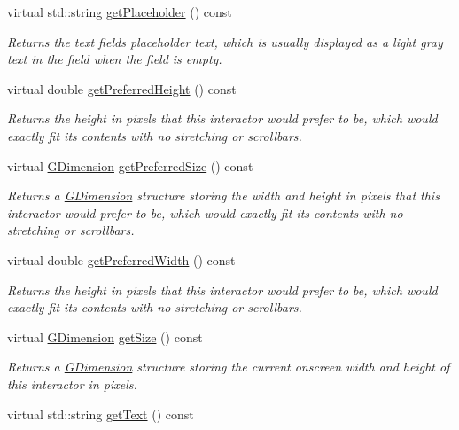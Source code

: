 \begin{DoxyCompactItemize}
virtual std\+::string \mbox{\hyperlink{classGTextField_aa78dbaa7dac1f8cdf9048c91abecc7ad}{get\+Placeholder}} () const
\begin{DoxyCompactList}\small\item\em Returns the text field\textquotesingle{}s placeholder text, which is usually displayed as a light gray text in the field when the field is empty. \end{DoxyCompactList}\item 
virtual double \mbox{\hyperlink{classGInteractor_a747de0961653847bdc6615dbf756d715}{get\+Preferred\+Height}} () const
\begin{DoxyCompactList}\small\item\em Returns the height in pixels that this interactor would prefer to be, which would exactly fit its contents with no stretching or scrollbars. \end{DoxyCompactList}\item 
virtual \mbox{\hyperlink{structGDimension}{G\+Dimension}} \mbox{\hyperlink{classGInteractor_a4aabbee761d8e9116275401131b7ccd1}{get\+Preferred\+Size}} () const
\begin{DoxyCompactList}\small\item\em Returns a \mbox{\hyperlink{structGDimension}{G\+Dimension}} structure storing the width and height in pixels that this interactor would prefer to be, which would exactly fit its contents with no stretching or scrollbars. \end{DoxyCompactList}\item 
virtual double \mbox{\hyperlink{classGInteractor_a82bca31d37700fb0e35d2743352efd5e}{get\+Preferred\+Width}} () const
\begin{DoxyCompactList}\small\item\em Returns the height in pixels that this interactor would prefer to be, which would exactly fit its contents with no stretching or scrollbars. \end{DoxyCompactList}\item 
virtual \mbox{\hyperlink{structGDimension}{G\+Dimension}} \mbox{\hyperlink{classGInteractor_a7b4eec96a2bdc6420695d5796a78eea9}{get\+Size}} () const
\begin{DoxyCompactList}\small\item\em Returns a \mbox{\hyperlink{structGDimension}{G\+Dimension}} structure storing the current onscreen width and height of this interactor in pixels. \end{DoxyCompactList}\item 
virtual std\+::string \mbox{\hyperlink{classGTextField_aff553c50924b836c29f146ed34a7c6ec}{get\+Text}} () const

\end{DoxyCompactItemize}
